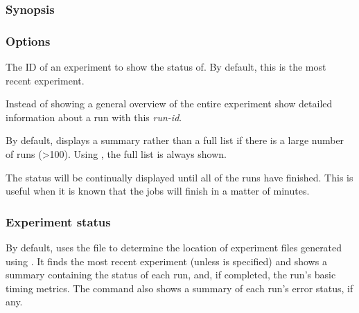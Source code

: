 \documentclass[a4paper,english]{article}
\begin{document}
\begin{adjustwidth}{18pt}{0pt}
            \subsubsection{Synopsis}
                 

            \subsubsection{Options}
                \begin{Description}[Options]
                  \item[\Arg{experiment-id}]
                    The ID of an experiment to show the status of.
                    By default, this is the most recent experiment.
                  \item[\OptArg{-i}{ run-id}]
                    Instead of showing a general overview of the entire experiment show detailed
                    information about a run with this \emph{run-id}.
                  \item[\Opt{\ddash full}]
                    By default,  displays a summary rather than a full list if there
                    is a large number of runs (>100). Using , the full list is
                    always shown.
                  \item[\Opt{\ddash follow}]
                    The status will be continually displayed until all of the runs have finished.
                    This is useful when it is known that the jobs will finish
                    in a matter of minutes.
                \end{Description}

            \subsubsection{Experiment status}
                By default,   uses the  file to determine the
                location of experiment files generated using  .
                It finds the most recent experiment (unless  is specified) and shows a summary
                containing the status of each run, and, if completed, the run's basic timing metrics.
                The command also shows a summary of each run's error status, if any.


\end{adjustwidth}
\end{document}
